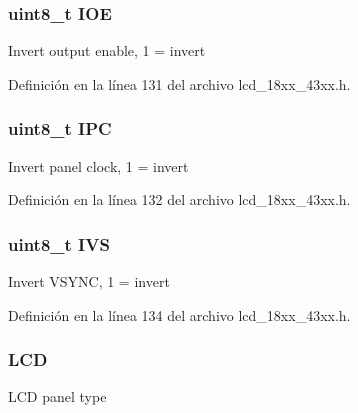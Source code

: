 \subsubsection[{\texorpdfstring{I\+OE}{IOE}}]{\setlength{\rightskip}{0pt plus 5cm}uint8\+\_\+t I\+OE}\hypertarget{struct_l_c_d___c_o_n_f_i_g___t_a40a2b55f4c43d96272aeddeb3c9033b9}{}\label{struct_l_c_d___c_o_n_f_i_g___t_a40a2b55f4c43d96272aeddeb3c9033b9}
Invert output enable, 1 = invert 

Definición en la línea 131 del archivo lcd\+\_\+18xx\+\_\+43xx.\+h.

\subsubsection[{\texorpdfstring{I\+PC}{IPC}}]{\setlength{\rightskip}{0pt plus 5cm}uint8\+\_\+t I\+PC}\hypertarget{struct_l_c_d___c_o_n_f_i_g___t_a7225dd1a0e385af9f28af9e1cbbfa43c}{}\label{struct_l_c_d___c_o_n_f_i_g___t_a7225dd1a0e385af9f28af9e1cbbfa43c}
Invert panel clock, 1 = invert 

Definición en la línea 132 del archivo lcd\+\_\+18xx\+\_\+43xx.\+h.

\subsubsection[{\texorpdfstring{I\+VS}{IVS}}]{\setlength{\rightskip}{0pt plus 5cm}uint8\+\_\+t I\+VS}\hypertarget{struct_l_c_d___c_o_n_f_i_g___t_ab27d9dd9f53968c1a7aeada3f1c27aaf}{}\label{struct_l_c_d___c_o_n_f_i_g___t_ab27d9dd9f53968c1a7aeada3f1c27aaf}
Invert V\+S\+Y\+NC, 1 = invert 

Definición en la línea 134 del archivo lcd\+\_\+18xx\+\_\+43xx.\+h.

\subsubsection[{\texorpdfstring{L\+CD}{LCD}}]{ L\+CD}\hypertarget{struct_l_c_d___c_o_n_f_i_g___t_a6182e9709ca338d887f449d63a6c14aa}{}\label{struct_l_c_d___c_o_n_f_i_g___t_a6182e9709ca338d887f449d63a6c14aa}
L\+CD panel type 

